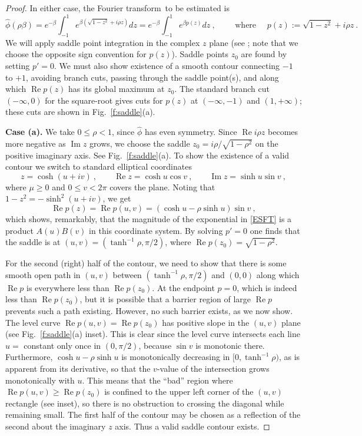\documentclass[10pt]{article}
\newcommand{\be}{\begin{equation}}
\newcommand{\ee}{\end{equation}}
\DeclareMathOperator{\re}{Re}
\DeclareMathOperator{\im}{Im}
\newcommand{\freq}{\beta}          %
\newcommand{\FT}{Fourier transform}
\begin{document}
\begin{proof}
In either case, the \FT\ to be estimated is
\be
\hat\phi(\rho\freq) = e^{-\freq} \int_{-1}^1
e^{\freq (\sqrt{1-z^2} + i\rho z)} dz
= e^{-\freq} \int_{-1}^1 e^{\freq p(z)} dz
~,\qquad\mbox{ where }\quad
p(z):=\sqrt{1-z^2} +i\rho z
~.
\label{ESFT}
\ee
We will apply saddle point integration in the
complex $z$ plane (see \cite[Thm.~7.1, p.~127]{olver};
note that we choose the opposite sign convention for $p(z)$).
Saddle points $z_0$ are found by setting $p'=0$.
We must also show existence of a smooth contour connecting $-1$
to $+1$, avoiding branch cuts,
passing through the saddle point(s), and along which $\re p(z)$
has its global maximum at $z_0$.
The standard branch cut $(-\infty,0)$ for the square-root gives
cuts for $p(z)$ at $(-\infty,-1)$ and $(1,+\infty)$;
these cuts are shown in Fig.~\ref{f:saddle}(a).

{\bf Case (a).}
We take $0\le \rho<1$, since $\hat\phi$ has even symmetry.
Since $\re i\rho z$ becomes more negative as $\im z$ grows,
we choose the saddle $z_0 = i\rho/\sqrt{1-\rho^2}$ on the
positive imaginary axis.
See Fig.~\ref{f:saddle}(a).
To show the existence of a valid contour we switch to standard elliptical
coordinates
\be
z = \cosh(u+iv)~,\qquad \re z = \cosh u \cos v~,\qquad \im z = \sinh u \sin v
~,
\label{ellip}
\ee
where $\mu\ge 0$ and $0\le v < 2\pi$ covers the plane.
Noting that $1-z^2 = -\sinh^2(u+iv)$, we get
$$
\re p(z) = \re p(u,v) = (\cosh u - \rho \sinh u) \sin v
~,
$$
which shows, remarkably, that the magnitude of the exponential
in \eqref{ESFT} is a product $A(u)B(v)$ in this coordinate system.
By solving $p'=0$ one finds that the saddle is at
$(u,v) = (\tanh^{-1} \rho, \pi/2)$,
where $\re p(z_0) = \sqrt{1-\rho^2}$.

For the second (right) half of the contour,
we need to show that there is some smooth open path in $(u,v)$ between
$(\tanh^{-1} \rho, \pi/2)$ and $(0,0)$ along which $\re p$ is
everywhere less than $\re p(z_0)$.
At the endpoint $p = 0$, which is indeed less than $\re p(z_0)$,
but it is possible that a barrier region of large $\re p$
prevents such a path existing.
However, no such barrier exists, as we now show.
The level curve $\re p(u,v) =\re p(z_0)$ has positive slope
in the $(u,v)$ plane (see Fig.~\ref{f:saddle}(a) inset).
This is clear since the level curve intersects each line $u=$ constant
only once in $(0,\pi/2)$, because $\sin v$ is monotonic there.
Furthermore, $\cosh u - \rho \sinh u$ is monotonically
decreasing in $[0,\tanh^{-1} \rho)$, as is apparent from its derivative,
so that the $v$-value of the intersection grows monotonically
with $u$.
This means that the ``bad'' region where $\re p(u,v) \ge \re p(z_0)$ is
confined to the upper left corner of the $(u,v)$ rectangle
(see inset), so there is no obstruction to crossing the diagonal
while remaining small.
The first half of the contour
may be chosen as a reflection of the second about the imaginary $z$ axis.
Thus a valid saddle contour exists.


\end{proof}
\end{document}
